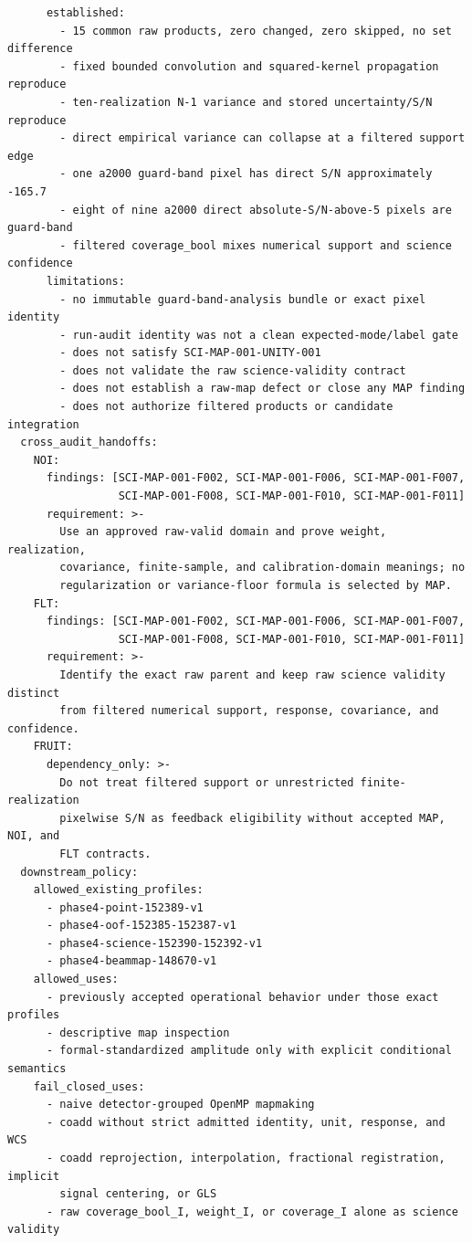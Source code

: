 \documentclass[11pt]{article}
\begin{document}
\begin{small}
\begin{verbatim}
      established:
        - 15 common raw products, zero changed, zero skipped, no set difference
        - fixed bounded convolution and squared-kernel propagation reproduce
        - ten-realization N-1 variance and stored uncertainty/S/N reproduce
        - direct empirical variance can collapse at a filtered support edge
        - one a2000 guard-band pixel has direct S/N approximately -165.7
        - eight of nine a2000 direct absolute-S/N-above-5 pixels are guard-band
        - filtered coverage_bool mixes numerical support and science confidence
      limitations:
        - no immutable guard-band-analysis bundle or exact pixel identity
        - run-audit identity was not a clean expected-mode/label gate
        - does not satisfy SCI-MAP-001-UNITY-001
        - does not validate the raw science-validity contract
        - does not establish a raw-map defect or close any MAP finding
        - does not authorize filtered products or candidate integration
  cross_audit_handoffs:
    NOI:
      findings: [SCI-MAP-001-F002, SCI-MAP-001-F006, SCI-MAP-001-F007,
                 SCI-MAP-001-F008, SCI-MAP-001-F010, SCI-MAP-001-F011]
      requirement: >-
        Use an approved raw-valid domain and prove weight, realization,
        covariance, finite-sample, and calibration-domain meanings; no
        regularization or variance-floor formula is selected by MAP.
    FLT:
      findings: [SCI-MAP-001-F002, SCI-MAP-001-F006, SCI-MAP-001-F007,
                 SCI-MAP-001-F008, SCI-MAP-001-F010, SCI-MAP-001-F011]
      requirement: >-
        Identify the exact raw parent and keep raw science validity distinct
        from filtered numerical support, response, covariance, and confidence.
    FRUIT:
      dependency_only: >-
        Do not treat filtered support or unrestricted finite-realization
        pixelwise S/N as feedback eligibility without accepted MAP, NOI, and
        FLT contracts.
  downstream_policy:
    allowed_existing_profiles:
      - phase4-point-152389-v1
      - phase4-oof-152385-152387-v1
      - phase4-science-152390-152392-v1
      - phase4-beammap-148670-v1
    allowed_uses:
      - previously accepted operational behavior under those exact profiles
      - descriptive map inspection
      - formal-standardized amplitude only with explicit conditional semantics
    fail_closed_uses:
      - naive detector-grouped OpenMP mapmaking
      - coadd without strict admitted identity, unit, response, and WCS
      - coadd reprojection, interpolation, fractional registration, implicit
        signal centering, or GLS
      - raw coverage_bool_I, weight_I, or coverage_I alone as science validity

\end{verbatim}
\end{small}
\end{document}
